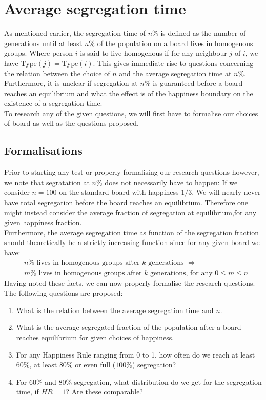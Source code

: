
\section{Average segregation time}
As mentioned earlier, the segregation time of \(n\%\) is defined as the number of generations until at least \(n\%\) of the population on a board lives in homogenous groups. 
Where person \(i\) is said to live homogenous if for any neighbour \(j\) of \(i\), we have \(\text{Type}(j)=\text{Type}(i)\).
This gives immediate rise to questions concerning the relation between the choice of \(n\) and the average segregation time at \(n\%\). 
Furthermore, it is unclear if segregation at \(n\%\) is guaranteed before a board reaches an equilibrium and what the effect is of the happiness boundary on the existence of a segregation time.\\

To research any of the given questions, we will first have to formalise our choices of board as well as the questions proposed.\\


\subsection{Formalisations}
Prior to starting any test or properly formalising our research questions however, we note that segratation at \(n\%\) does not necessarily have to happen: 
If we consider \(n=100\) on the standard board with happiness \(1/3\). We will nearly never have total segregation before the board reaches an equilibrium.
Therefore one might instead consider the average fraction of segregation at equilibrium,for any given happiness fraction. \\

Furthermore, the average segregation time as function of the segregation fraction should theoretically be a strictly increasing function since for any given board we have:
\begin{align*}
&n\% \text{ lives in homogenous groups after } k \text{ generations } \Rightarrow\\
& m\% \text{ lives in homogenous groups after } k \text{ generations, for any } 0 \leq m \leq n
\end{align*} 
Having noted these facts, we can now properly formalise the research questions.\\
The following questions are proposed:
\begin{enumerate}
 \item What is the relation between the average segregation time and \(n\).
 \item What is the average segregated fraction of the population after a board reaches equilibrium for given choices of happiness.
 \item For any Happiness Rule ranging from 0 to 1, how often do we reach at least $60\%$, at least $80\%$ or even full ($100\%$) segregation?
 \item For $60\%$ and $80\%$ segregation, what distribution do we get for the segregation time, if $HR = 1$? Are these comparable?
\end{enumerate}

